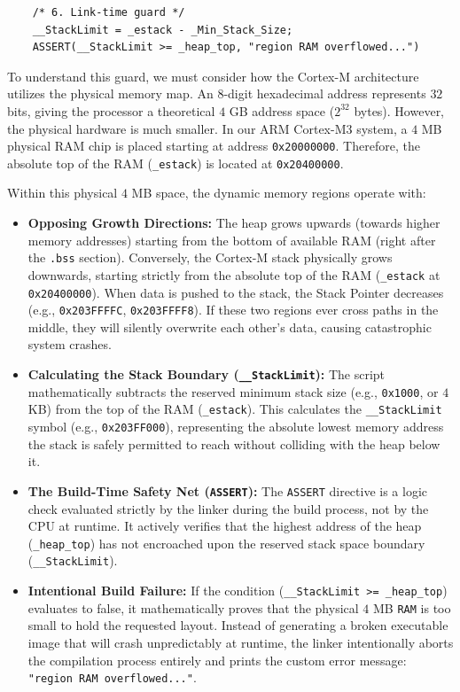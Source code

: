 \begin{lstlisting}
    /* 6. Link-time guard */
    __StackLimit = _estack - _Min_Stack_Size;
    ASSERT(__StackLimit >= _heap_top, "region RAM overflowed...")
\end{lstlisting}

To understand this guard, we must consider how the Cortex-M architecture utilizes the physical memory map. An $8$-digit hexadecimal address represents $32$ bits, giving the processor a theoretical $4$ GB address space ($2^{32}$ bytes). However, the physical hardware is much smaller. In our ARM Cortex-M3 system, a $4$ MB physical RAM chip is placed starting at address \texttt{0x20000000}. Therefore, the absolute top of the RAM (\texttt{\_estack}) is located at \texttt{0x20400000}.

Within this physical $4$ MB space, the dynamic memory regions operate with:
\begin{itemize}
    \item \textbf{Opposing Growth Directions:} The heap grows upwards (towards higher memory addresses) starting from the bottom of available RAM (right after the \texttt{.bss} section). Conversely, the Cortex-M stack physically grows downwards, starting strictly from the absolute top of the RAM (\texttt{\_estack} at \texttt{0x20400000}). When data is pushed to the stack, the Stack Pointer decreases (e.g., \texttt{0x203FFFFC}, \texttt{0x203FFFF8}). If these two regions ever cross paths in the middle, they will silently overwrite each other's data, causing catastrophic system crashes.
    \item \textbf{Calculating the Stack Boundary (\texttt{\_\_StackLimit}):} The script mathematically subtracts the reserved minimum stack size (e.g., \texttt{0x1000}, or $4$ KB) from the top of the RAM (\texttt{\_estack}). This calculates the \texttt{\_\_StackLimit} symbol (e.g., \texttt{0x203FF000}), representing the absolute lowest memory address the stack is safely permitted to reach without colliding with the heap below it.
    \item \textbf{The Build-Time Safety Net (\texttt{ASSERT}):} The \texttt{ASSERT} directive is a logic check evaluated strictly by the linker during the build process, not by the CPU at runtime. It actively verifies that the highest address of the heap (\texttt{\_heap\_top}) has not encroached upon the reserved stack space boundary (\texttt{\_\_StackLimit}).
    \item \textbf{Intentional Build Failure:} If the condition (\texttt{\_\_StackLimit >= \_heap\_top}) evaluates to false, it mathematically proves that the physical $4$ MB \texttt{RAM} is too small to hold the requested layout. Instead of generating a broken executable image that will crash unpredictably at runtime, the linker intentionally aborts the compilation process entirely and prints the custom error message: \texttt{"region RAM overflowed..."}.
\end{itemize}

